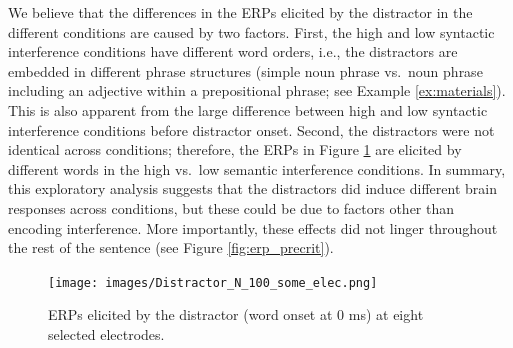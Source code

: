 \documentclass[a4paper, man, floatsintext]{apa7}
\begin{document}
{We believe that the differences in the ERPs elicited by the distractor in the different conditions are caused by two factors. First, the high and low syntactic interference conditions have different word orders, i.e., the distractors are embedded in different phrase structures (simple noun phrase vs.\ noun phrase including an adjective within a prepositional phrase; see Example \ref{ex:materials}). This is also apparent from the large difference between high and low syntactic interference conditions before distractor onset. Second, the distractors were not identical across conditions; therefore, the ERPs in Figure \ref{fig:erp_distractor} are elicited by different words in the high vs.\ low semantic interference conditions. In summary, this exploratory analysis suggests that the distractors did induce different brain responses across conditions, but these could be due to factors other than encoding interference. More importantly, these effects did not linger throughout the rest of the sentence (see Figure \ref{fig:erp_precrit}). 

\begin{figure}[H]
    \centering
        \caption{ERPs elicited by the distractor (word onset at 0 ms) at eight selected electrodes.}
    \label{fig:erp_distractor}\texttt{[image: images/Distractor\_N\_100\_some\_elec.png]}
\end{figure}

}
\end{document}
